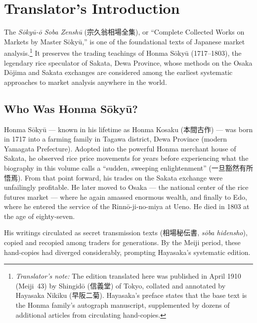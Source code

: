 \documentclass[10pt, openany]{book}
\newcommand{\jp}[1]{{\japanesefont #1}}
\newcommand{\tn}[1]{\footnote{\textit{Translator's note:} #1}}
\begin{document}
\thispagestyle{empty}
\tableofcontents
\newpage

\chapter*{Translator's Introduction}

The \textit{S\=oky\=u-\=o Soba Zensh\=u} (\jp{宗久翁相場全集}), or
``Complete Collected Works on Markets by Master S\=oky\=u,'' is one of
the foundational texts of Japanese market analysis.\tn{The edition
translated here was published in April 1910 (Meiji~43) by Shingid\=o
(\jp{信義堂}) of Tokyo, collated and annotated by Hayasaka Nikiku
(\jp{早阪二菊}). Hayasaka's preface states that the base text is the
Honma family's autograph manuscript, supplemented by dozens of additional
articles from circulating hand-copies.}
It preserves the trading teachings of Honma S\=oky\=u (1717--1803), the
legendary rice speculator of Sakata, Dewa Province, whose methods on the
Osaka D\=ojima and Sakata exchanges are considered among the earliest
systematic approaches to market analysis anywhere in the world.

\section*{Who Was Honma S\=oky\=u?}

Honma S\=oky\=u --- known in his lifetime as Honma Kosaku (\jp{本間古作})
--- was born in 1717 into a farming family in Tagawa district, Dewa
Province (modern Yamagata Prefecture). Adopted into the powerful Honma
merchant house of Sakata, he observed rice price movements for years
before experiencing what the biography in this volume calls a ``sudden,
sweeping enlightenment'' (\jp{一旦豁然有所悟焉}). From that point
forward, his trades on the Sakata exchange were unfailingly profitable.
He later moved to Osaka --- the national center of the rice futures
market --- where he again amassed enormous wealth, and finally to Edo,
where he entered the service of the Rinn\=o-ji-no-miya at Ueno. He died
in 1803 at the age of eighty-seven.

His writings circulated as secret transmission texts (\jp{相場秘伝書},
\textit{s\=oba hidensho}), copied and recopied among traders for
generations. By the Meiji period, these hand-copies had diverged
considerably, prompting Hayasaka's systematic edition.
\end{document}
